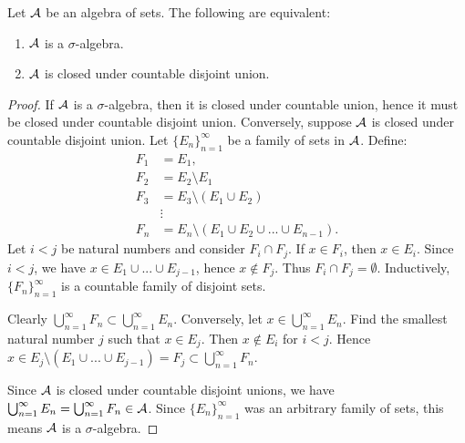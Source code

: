     \begin{proposition}
        Let $\mathcal{A}$ be an algebra of sets. The following are equivalent:
            \begin{enumerate}[label = (\arabic*),itemsep=1pt,topsep=3pt]
                \item $\mathcal{A}$ is a $\sigma$-algebra.
                \item $\mathcal{A}$ is closed under countable disjoint union.
            \end{enumerate}
    \end{proposition}
        \begin{proof}
            If $\mathcal{A}$ is a $\sigma$-algebra, then it is closed under countable union, hence it must be closed under countable disjoint union. Conversely, suppose $\mathcal{A}$ is closed under countable disjoint union. Let $\{E_n\}_{n = 1}^\infty$ be a family of sets in $\mathcal{A}$. Define:
                \begin{equation*}
                \begin{split}
                    F_1 &= E_1, \\
                    F_2 &= E_2 \setminus E_1 \\
                    F_3 &= E_3 \setminus (E_1 \cup E_2) \\
                    &\vdots \\
                    F_n &= E_n \setminus \left( E_1 \cup E_2 \cup ... \cup E_{n-1} \right).
                \end{split}
                \end{equation*}
            Let $i < j$ be natural numbers and consider $F_i \cap F_j$. If $x \in F_i$, then $x \in E_i$. Since $i < j$, we have $x \in E_1 \cup ... \cup E_{j-1}$, hence $x \not\in F_j$. Thus $F_i \cap F_j = \emptyset$. Inductively, $\{F_n\}_{n = 1}^\infty$ is a countable family of disjoint sets.

            Clearly $\bigcup_{n = 1}^\infty F_n \subset \bigcup_{n = 1}^\infty E_n$. Conversely, let $x \in \bigcup_{n = 1}^\infty E_n$. Find the smallest natural number $j$ such that $x \in E_j$. Then $x \not\in E_i$ for $i < j$. Hence $x \in E_j \setminus (E_1 \cup ... \cup E_{j-1}) = F_j \subset \bigcup_{n=1}^\infty F_n$.

            Since $\mathcal{A}$ is closed under countable disjoint unions, we have $\bigcup_{n = 1}^\infty E_n = \bigcup_{n = 1}^\infty F_n \in \mathcal{A}$. Since $\{E_n\}_{n = 1}^\infty$ was an arbitrary family of sets, this means $\mathcal{A}$ is a $\sigma$-algebra.
        \end{proof}

